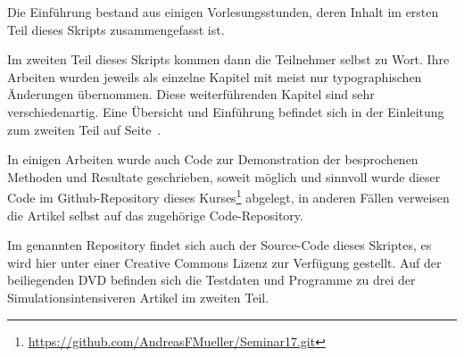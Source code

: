 Die Einführung bestand aus einigen Vorlesungsstunden, deren
Inhalt im ersten Teil dieses Skripts zusammengefasst ist.  

Im zweiten Teil dieses Skripts kommen dann die Teilnehmer selbst zu Wort.
Ihre Arbeiten wurden jeweils als einzelne
Kapitel mit meist nur typographischen Änderungen übernommen.
Diese weiterführenden Kapitel sind sehr verschiedenartig.
Eine Übersicht und Einführung befindet sich in der Einleitung
zum zweiten Teil auf Seite~\pageref{skript:uebersicht}.

In einigen Arbeiten wurde auch Code zur Demonstration der 
besprochenen Methoden und Resultate geschrieben, soweit
möglich und sinnvoll wurde dieser Code im Github-Repository
dieses Kurses\footnote{\url{https://github.com/AndreasFMueller/Seminar17.git}}
abgelegt, in anderen Fällen verweisen die Artikel selbst auf
das zugehörige Code-Repository.

Im genannten Repository findet sich auch der Source-Code dieses
Skriptes, es wird hier unter einer Creative Commons Lizenz
zur Verfügung gestellt.
Auf der beiliegenden DVD befinden sich die Testdaten und Programme
zu drei der Simulationsintensiveren Artikel im zweiten Teil.


